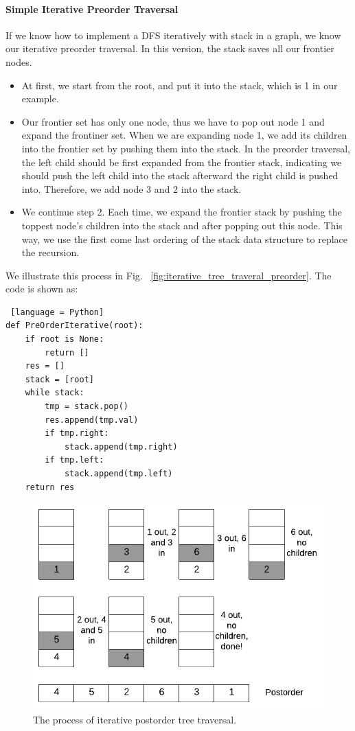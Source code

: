 \documentclass[main.tex]{subfiles}
\begin{document}
\paragraph{Simple Iterative Preorder Traversal} If we know how to implement a DFS iteratively with stack in a graph, we know our iterative preorder traversal. In this version, the stack saves all our frontier nodes. 
\begin{itemize}
    \item At first, we start from the root, and put it into the stack, which is 1 in our example.  
    \item  Our frontier set has only one node, thus we have to pop out node 1 and expand the frontiner set. When we are expanding node 1, we add its children into the frontier set by pushing them into the stack. In the preorder traversal, the left child should be first expanded from the frontier stack, indicating we should push the left child into the stack afterward the right child is pushed into. Therefore, we add node 3 and 2 into the stack. 
    \item We continue step 2.  Each time, we expand the frontier stack by pushing the toppest node's children into the stack and after popping out this node. This way, we use the first come last ordering of the stack data structure to replace the recursion.
\end{itemize}
We illustrate this process in Fig. ~\ref{fig:iterative_tree_traveral_preorder}.  The code is shown as:
\begin{lstlisting} [language = Python]
def PreOrderIterative(root):
    if root is None:
        return []
    res = []
    stack = [root]
    while stack:
        tmp = stack.pop()
        res.append(tmp.val)
        if tmp.right:
            stack.append(tmp.right)
        if tmp.left:
            stack.append(tmp.left)
    return res
\end{lstlisting}
\begin{figure}[!ht]
    \centering
    \includegraphics[width = .9\columnwidth]{fig/iterative_tree_traversal_postorder.png}
    \caption{The process of iterative postorder tree traversal.}
    \label{fig:iterative_tree_traveral_postorder}
\end{figure}
\end{document}
